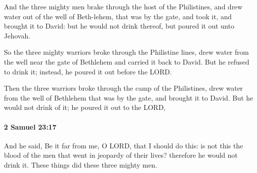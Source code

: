 			\begin{versebox}
					\item[BHS] 
					\item[ASV] And the three mighty men brake through the host of the Philistines, and drew water out of the well of Beth-lehem, that was by the gate, and took it, and brought it to David: but he would not drink thereof, but poured it out unto Jehovah.
					\item[NIV] So the three mighty warriors broke through the Philistine lines, drew water from the well near the gate of Bethlehem and carried it back to David. But he refused to drink it; instead, he poured it out before the LORD.
					\item[NRSV] Then the three warriors broke through the camp of the Philistines, drew water from the well of Bethlehem that was by the gate, and brought it to David. But he would not drink of it; he poured it out to the LORD,
			\end{versebox}

		\paragraph{2 Samuel 23:17} %
			\label{2SAMUEL-23-17}

			And he said, Be it far from me, O LORD, that I should do this: is not this the blood of the men that went in jeopardy of their lives? therefore he would not drink it. These things did these three mighty men.

